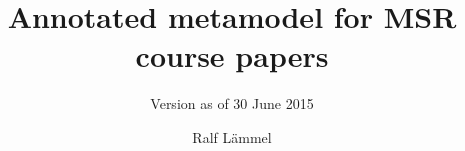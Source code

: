 \documentclass{llncs}
\begin{document}
\title{Annotated metamodel for MSR course papers}
\subtitle{Version as of 30 June 2015}
\author{Ralf L\"ammel}

\maketitle









\appendix




\end{document}

